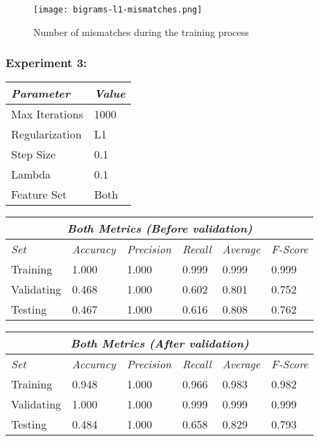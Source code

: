 \documentclass[11pt]{article}
\begin{document}
\begin{figure}[H]
  \caption{Number of mismatches during the training process}
  \texttt{[image: bigrams-l1-mismatches.png]}
  \centering
\end{figure}



\clearpage
\subsubsection*{Experiment 3:}

\begin{table}[H]
\centering
\begin{tabular}{ |p{3cm}||p{2cm}|  }
 \hline
 \textit{Parameter} & \textit{Value} \\
 \hline
 Max Iterations   & 1000 \\
 Regularization & L1 \\
 Step Size    & 0.1 \\
 Lambda    & 0.1 \\
 Feature Set    & Both \\
 \hline
\end{tabular}
\end{table}

\begin{table}[H]
\centering
\begin{tabular}{ |p{2cm}||p{2cm}|p{2cm}|p{2cm}|p{2cm}|p{2cm}|  }
 \hline
 \multicolumn{6}{|c|}{\textbf{\textit{Both Metrics (Before validation)}}} \\
 \hline
 \textit{Set} & \textit{Accuracy} & \textit{Precision} & \textit{Recall} & \textit{Average} & \textit{F-Score} \\
 \hline
 Training   & 1.000 & 1.000 & 0.999 & 0.999 & 0.999 \\
 Validating & 0.468 & 1.000 & 0.602 & 0.801 & 0.752 \\
 Testing    & 0.467 & 1.000 & 0.616 & 0.808 & 0.762 \\
 \hline
\end{tabular}
\end{table}

\begin{table}[H]
\centering
\begin{tabular}{ |p{2cm}||p{2cm}|p{2cm}|p{2cm}|p{2cm}|p{2cm}|  }
 \hline
 \multicolumn{6}{|c|}{\textbf{\textit{Both Metrics (After validation)}}} \\
 \hline
 \textit{Set} & \textit{Accuracy} & \textit{Precision} & \textit{Recall} & \textit{Average} & \textit{F-Score} \\
 \hline
 Training   & 0.948 & 1.000 & 0.966 & 0.983 & 0.982 \\
 Validating & 1.000 & 1.000 & 0.999 & 0.999 & 0.999 \\
 Testing    & 0.484 & 1.000 & 0.658 & 0.829 & 0.793 \\
 \hline
\end{tabular}
\end{table}
\end{document}
